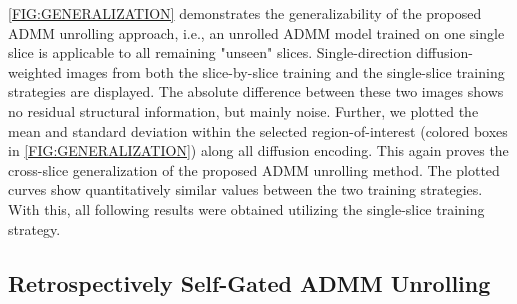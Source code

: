 \documentclass[journal,twoside,web]{ieeecolor}
\begin{document}
	\cref{FIG:GENERALIZATION} demonstrates the generalizability 
	of the proposed ADMM unrolling approach, 
	i.e., an unrolled ADMM model trained on one single slice 
	is applicable to all remaining "unseen" slices. 
	Single-direction diffusion-weighted images from 
	both the slice-by-slice training 
	and the single-slice training strategies are displayed. 
	The absolute difference between these two images 
	shows no residual structural information, but mainly noise.
	Further, we plotted the mean and standard deviation 
	within the selected region-of-interest (colored boxes in \cref{FIG:GENERALIZATION}) 
	along all diffusion encoding.
	This again proves the cross-slice generalization 
	of the proposed ADMM unrolling method.
	The plotted curves show quantitatively similar values 
	between the two training strategies.
	With this, all following results were obtained 
	utilizing the single-slice training strategy.

	\subsection{Retrospectively Self-Gated ADMM Unrolling}
\end{document}
